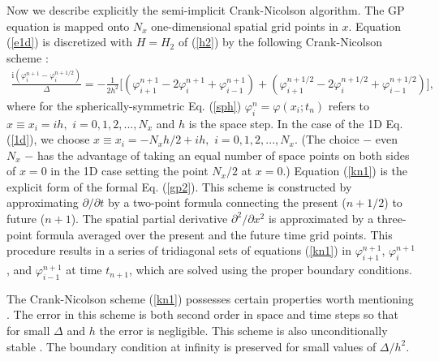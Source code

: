 \documentclass[onecolumn]{elsart3p}
\begin{document}
Now we describe explicitly the semi-implicit
Crank-Nicolson algorithm.
The GP
equation is mapped onto  $N_x$ one-dimensional spatial grid points in
$x$.
Equation (\ref{e1d}) is discretized with $H=H_2$ of (\ref{h2}) by the
following Crank-Nicolson scheme \cite{koonin,ames,dtray}:
\begin{align}\label{kn1}
\frac{\mbox{i}(\varphi_{i}^{n+1}-
\varphi_{i}^{n+1/2})}{\Delta}=-\frac{1}{2h^2}\biggr[(\varphi^{n+1}_{i+1}-
2\varphi^{n+1}_i
+\varphi^{n+1}_{i-1})
+(\varphi^{n+1/2}_{i+1}-2\varphi_{i}^{n+1/2}
+\varphi^{n+1/2}_{i-1})\biggr],
\end{align}
where for the spherically-symmetric Eq. (\ref{sph})
$\varphi_i^n=\varphi(x_i;t_n)$ refers to  $x\equiv x_i=ih,$
$i=0,1,2,...,N_x$  and $h$ is the space 
step.
In the case of
the 
1D Eq. (\ref{1d}), we  choose  $x\equiv x_i=-N_xh/2+  ih,$
$i=0,1,2,...,N_x$.
 {(The choice $-$ even $N_x$ $-$ has the
advantage
of taking an equal number of space points on both sides of $x=0$ in the
1D  case setting the point $N_x/2$ at $x=0$.)} 
Equation (\ref{kn1}) is the
explicit form of the formal Eq. (\ref{gp2}). This scheme is
constructed by approximating $\partial /\partial t$ by a two-point
formula connecting the present ($n+1/2$) to future ($n+1$). The
spatial partial derivative
$\partial^2 /\partial x^2$ is
approximated  by a three-point formula averaged over the present and
the future time grid points.
This
procedure results in a series of tridiagonal sets of equations
(\ref{kn1}) in $\varphi^{n+1}_{i+1}$,  $\varphi^{n+1}_{i}$, and
$\varphi^{n+1}_{i-1}$ at time $t_{n+1}$, which are solved using the
proper boundary conditions.


The Crank-Nicolson scheme (\ref{kn1}) possesses certain properties
worth mentioning \cite{ames,dtray}. The error in this scheme is both
second order in space and time steps so that for small $\Delta$ and
$h$ the error is negligible. This scheme is also unconditionally
stable \cite{dtray}. The boundary condition at infinity is preserved for
small
values of $\Delta/h^2$\cite{dtray}.
\end{document}
